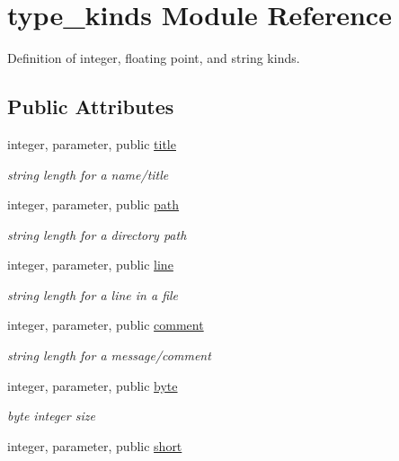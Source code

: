 \hypertarget{classtype__kinds}{\section{type\-\_\-kinds Module Reference}
\label{classtype__kinds}
}


Definition of integer, floating point, and string kinds.  


\subsection*{Public Attributes}
\begin{DoxyCompactItemize}
\item 
integer, parameter, public \hyperlink{classtype__kinds_aa2f577aea616d9b9bb91ce438bdf3c02}{title}
\begin{DoxyCompactList}\small\item\em string length for a name/title \end{DoxyCompactList}\item 
integer, parameter, public \hyperlink{classtype__kinds_a05ab6f6ff4279480c4fd6d8b04a3efbf}{path}
\begin{DoxyCompactList}\small\item\em string length for a directory path \end{DoxyCompactList}\item 
integer, parameter, public \hyperlink{classtype__kinds_af0560ef37c612847670ffbfba8a9bc33}{line}
\begin{DoxyCompactList}\small\item\em string length for a line in a file \end{DoxyCompactList}\item 
integer, parameter, public \hyperlink{classtype__kinds_abb1584a815b1c1b79301d6f922366eec}{comment}
\begin{DoxyCompactList}\small\item\em string length for a message/comment \end{DoxyCompactList}\item 
integer, parameter, public \hyperlink{classtype__kinds_a13366a08a0935a72c203e1b880b4d49e}{byte}
\begin{DoxyCompactList}\small\item\em byte integer size \end{DoxyCompactList}\item 
integer, parameter, public \hyperlink{classtype__kinds_ab4d7bfce672e6152e78f87f8aa5b2e04}{short}

\end{DoxyCompactItemize}
